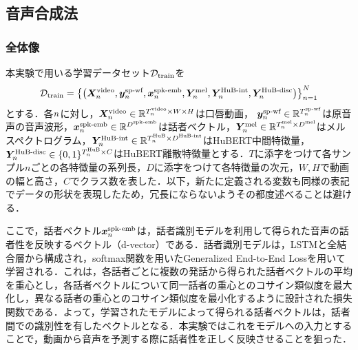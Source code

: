 \subsection{音声合成法}
\subsubsection{全体像}
本実験で用いる学習データセット$\mathcal{D}_{\text{train}}$を
\begin{equation}
    \mathcal{D}_{\text{train}} = \left\{\left(\bm{X}^{\text{video}}_{n}, \bm{y}^{\text{sp-wf}}_{n}, \bm{x}^{\text{spk-emb}}_{n}, \bm{Y}^{\text{mel}}_{n}, \bm{Y}^{\text{HuB-int}}_{n}, \bm{Y}^{\text{HuB-disc}}_{n}\right)\right\}_{n = 1}^{N}
\end{equation}
とする．各$n$に対し，$\bm{X}^{\text{video}}_{n} \in \mathbb{R}^{T^{\text{video}}_{n} \times W \times H}$は口唇動画， $\bm{y}^{\text{sp-wf}}_{n} \in \mathbb{R}^{T^{\text{sp-wf}}_{n}}$は原音声の音声波形，$\bm{x}^{\text{spk-emb}}_{n} \in \mathbb{R}^{D^{\text{spk-emb}}}$は話者ベクトル，$\bm{Y}^{\text{mel}}_{n} \in \mathbb{R}^{T^{\text{mel}}_{n} \times D^{\text{mel}}}$はメルスペクトログラム，$\bm{Y}^{\text{HuB-int}}_{n} \in \mathbb{R}^{T^{\text{HuB}}_{n} \times D^{\text{HuB-int}}}$はHuBERT中間特徴量，$\bm{Y}^{\text{HuB-disc}}_{n} \in \{0, 1\}^{T^{\text{HuB}}_{n} \times C}$はHuBERT離散特徴量とする．$T$に添字をつけて各サンプル$n$ごとの各特徴量の系列長，$D$に添字をつけて各特徴量の次元，$W, H$で動画の幅と高さ，$C$でクラス数を表した．以下，新たに定義される変数も同様の表記でデータの形状を表現したため，冗長にならないようその都度述べることは避ける．

ここで，話者ベクトル$\bm{x}^{\text{spk-emb}}_{n}$は，話者識別モデル\cite{wan2018generalized}を利用して得られた音声の話者性を反映するベクトル（d-vector）である．話者識別モデルは，LSTMと全結合層から構成され，softmax関数を用いたGeneralized End-to-End Lossを用いて学習される．これは，各話者ごとに複数の発話から得られた話者ベクトルの平均を重心とし，各話者ベクトルについて同一話者の重心とのコサイン類似度を最大化し，異なる話者の重心とのコサイン類似度を最小化するように設計された損失関数である．よって，学習されたモデルによって得られる話者ベクトルは，話者間での識別性を有したベクトルとなる．本実験ではこれをモデルへの入力とすることで，動画から音声を予測する際に話者性を正しく反映させることを狙った．

